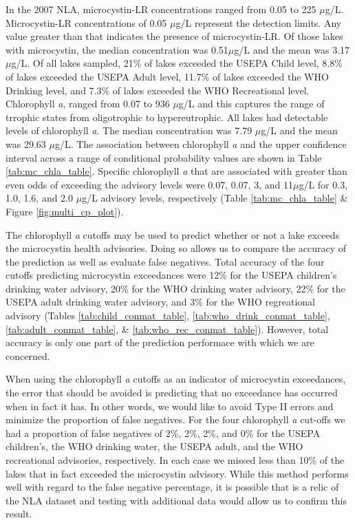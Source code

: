 \documentclass[11pt,]{article}
\begin{document}
In the 2007 NLA, microcystin-LR concentrations ranged from 0.05 to 225
\(\mu\)g/L. Microcystin-LR concentrations of 0.05 \(\mu\)g/L represent
the detection limits. Any value greater than that indicates the presence
of microcystin-LR. Of those lakes with microcystin, the median
concentration was 0.51\(\mu\)g/L and the mean was 3.17\(\mu\)g/L. Of all
lakes sampled, 21\% of lakes exceeded the USEPA Child level, 8.8\% of
lakes exceeded the USEPA Adult level, 11.7\% of lakes exceeded the WHO
Drinking level, and 7.3\% of lakes exceeded the WHO Recreational level.
Chlorophyll \emph{a}, ranged from 0.07 to 936 \(\mu\)g/L and this
captures the range of trrophic states from oligotrophic to
hypereutrophic. All lakes had detectable levels of chlorophyll \emph{a}.
The median concentration was 7.79 \(\mu\)g/L and the mean was 29.63
\(\mu\)g/L. The association between chlorophyll \emph{a} and the upper
confidence interval across a range of conditional probability values are
shown in Table \ref{tab:mc_chla_table}. Specific chlorophyll \emph{a}
that are associated with greater than even odds of exceeding the
advisory levels were 0.07, 0.07, 3, and 11\(\mu\)g/L for 0.3, 1.0, 1.6,
and 2.0 \(\mu\)g/L advisory levels, respectively (Table
\ref{tab:mc_chla_table} \& Figure \ref{fig:multi_cp_plot}).

The chlorophyll \emph{a} cutoffs may be used to predict whether or not a
lake exceeds the microcystin health advisories. Doing so allows us to
compare the accuracy of the prediction as well as evaluate false
negatives. Total accuracy of the four cutoffs predicting microcystin
exceedances were 12\% for the USEPA children's drinking water advisory,
20\% for the WHO drinking water advisory, 22\% for the USEPA adult
drinking water advisory, and 3\% for the WHO regreational advisory
(Tables \ref{tab:child_conmat_table}, \ref{tab:who_drink_conmat_table},
\ref{tab:adult_conmat_table}, \& \ref{tab:who_rec_conmat_table}).
However, total accuracy is only one part of the prediction performace
with which we are concerned.

When using the chlorophyll \emph{a} cutoffs as an indicator of
microcystin exceedances, the error that should be avoided is predicting
that no exceedance has occurred when in fact it has. In other words, we
would like to avoid Type II errors and minimize the proportion of false
negatives. For the four chlorophyll \emph{a} cut-offs we had a
proportion of false negatives of 2\%, 2\%, 2\%, and 0\% for the USEPA
children's, the WHO drinking water, the USEPA adult, and the WHO
recreational advisories, respectively. In each case we missed less than
10\% of the lakes that in fact exceeded the microcystin advisory. While
this method performs well with regard to the false negative percentage,
it is possible that is a relic of the NLA dataset and testing with
additional data would allow us to confirm this result.
\end{document}
